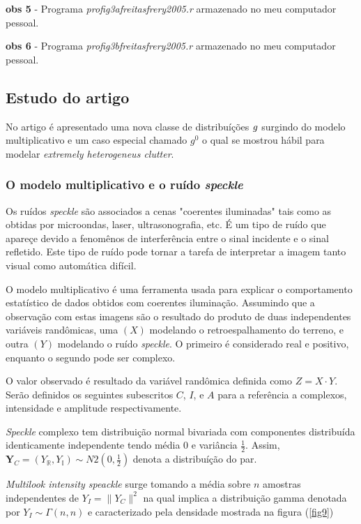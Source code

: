 \documentclass[12pt,a4paper]{article}
\begin{document}
{\bf obs 5} - Programa {\it profig3afreitasfrery2005.r} armazenado no meu computador pessoal.

{\bf obs 6} - Programa {\it profig3bfreitasfrery2005.r} armazenado no meu computador pessoal.

\subsection{Estudo do artigo  \cite{frery_muller_1997}}

No artigo é apresentado uma nova classe de distribuíções ${\it g}$ surgindo do modelo multiplicativo e um caso especial chamado {\it $g^{0}$} o qual se mostrou hábil para modelar  {\it extremely heterogeneus clutter}.


\subsubsection{O modelo multiplicativo e o ruído {\it speckle}}

Os ruídos {\it speckle} são associados a cenas "coerentes iluminadas" tais como as obtidas por microondas, laser, ultrasonografia, etc. É um tipo de ruído que apareçe devido a fenomênos de interferência entre o sinal incidente e o sinal refletido. Este tipo de ruído pode tornar a tarefa de interpretar a imagem tanto visual como automática difícil. 

O modelo multiplicativo é uma ferramenta usada para explicar o comportamento estatístico de dados obtidos com coerentes iluminação. Assumindo que a observação com estas imagens são o resultado do produto de duas independentes variáveis randômicas, uma $(X)$ modelando o retroespalhamento do terreno, e outra $(Y)$ modelando o ruído {\it speckle}. O primeiro é considerado real e positivo, enquanto o segundo pode ser complexo.

O valor observado é resultado da variável randômica definida como $Z=X\cdot Y$. Serão definidos os seguintes subescritos $C$, $I$, e $A$ para a referência a complexos, intensidade e amplitude respectivamente.

{\it Speckle} complexo tem distribuição normal bivariada com componentes distribuída identicamente independente tendo média $0$ e variância $\frac{1}{2}$. Assim, $\mathbf{Y}_{C}=(Y_{\mathbb{R}}, Y_{\mathbb{I}})\sim N2(0,\frac{1}{2})$ denota a distribuíção do par.

{\it Multilook intensity speackle} surge tomando a média sobre $n$ amostras independentes de $Y_{I}=\|Y_{C}\|^2$ na qual implica a distribuição gamma denotada por $Y_{I}\sim \Gamma(n,n)$ e caracterizado pela densidade mostrada na figura (\ref{fig9})
\end{document}
